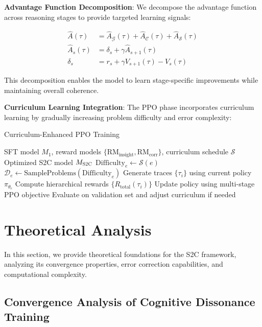 \documentclass[10pt,twocolumn]{article}
\newcommand{\ssc}{\textsc{S2C}}
\newcommand{\Generator}{\mathcal{G}}
\newcommand{\Critic}{\mathcal{C}}
\newcommand{\Synthesizer}{\mathcal{S}}
\newcommand{\RMinsight}{\text{RM}_{\text{insight}}}
\newcommand{\RMcorr}{\text{RM}_{\text{corr}}}
\begin{document}
\textbf{Advantage Function Decomposition}: We decompose the advantage function across reasoning stages to provide targeted learning signals:

\begin{align}
\hat{A}(\tau) &= \hat{A}_{\Generator}(\tau) + \hat{A}_{\Critic}(\tau) + \hat{A}_{\Synthesizer}(\tau) \\
\hat{A}_s(\tau) &= \delta_s + \gamma \hat{A}_{s+1}(\tau) \\
\delta_s &= r_s + \gamma V_{s+1}(\tau) - V_s(\tau)
\end{align}

This decomposition enables the model to learn stage-specific improvements while maintaining overall coherence.

\textbf{Curriculum Learning Integration}: The PPO phase incorporates curriculum learning by gradually increasing problem difficulty and error complexity:

\begin{algorithm}[H]
\caption{Curriculum-Enhanced PPO Training}
\label{alg:curriculum_ppo}
\begin{algorithmic}[1]
\REQUIRE SFT model $M_1$, reward models $\{\RMinsight, \RMcorr\}$, curriculum schedule $\mathcal{S}$
\ENSURE Optimized \ssc{} model $M_{\ssc{}}$
    \STATE $\text{Difficulty}_e \leftarrow \mathcal{S}(e)$  
    \STATE $\mathcal{D}_e \leftarrow \text{SampleProblems}(\text{Difficulty}_e)$
        \STATE Generate traces $\{\tau_i\}$ using current policy $\pi_{\theta_e}$
        \STATE Compute hierarchical rewards $\{R_{\text{total}}(\tau_i)\}$
        \STATE Update policy using multi-stage PPO objective
    \ENDFOR
    \STATE Evaluate on validation set and adjust curriculum if needed
\ENDFOR
\end{algorithmic}
\end{algorithm}

\section{Theoretical Analysis} \label{sec:theory}

In this section, we provide theoretical foundations for the \ssc{} framework, analyzing its convergence properties, error correction capabilities, and computational complexity.

\subsection{Convergence Analysis of Cognitive Dissonance Training}
\end{document}
